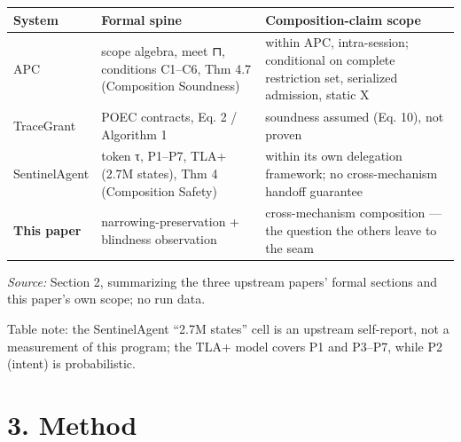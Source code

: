 \documentclass[
  10pt,
]{article}
\newcounter{none} %
\renewcommand{\_}{\allowbreak\origunderscore}
\begin{document}
{\def\LTcaptype{none} %
\begin{longtable}[]{@{}
  >{\raggedright\arraybackslash}p{}
  >{\raggedright\arraybackslash}p{}
  >{\raggedright\arraybackslash}p{}@{}}
\toprule\noalign{}
\begin{minipage}[b]{\linewidth}\raggedright
System
\end{minipage} & \begin{minipage}[b]{\linewidth}\raggedright
Formal spine
\end{minipage} & \begin{minipage}[b]{\linewidth}\raggedright
Composition-claim scope
\end{minipage} \\
\midrule\noalign{}
\endhead
\bottomrule\noalign{}
\endlastfoot
APC & scope algebra, meet ⊓, conditions C1--C6, Thm 4.7 (Composition
Soundness) & within APC, intra-session; conditional on complete
restriction set, serialized admission, static X \\
TraceGrant & POEC contracts, Eq. 2 / Algorithm 1 & soundness assumed
(Eq. 10), not proven \\
SentinelAgent & token τ, P1--P7, TLA+ (2.7M states), Thm 4 (Composition
Safety) & within its own delegation framework; no cross-mechanism
handoff guarantee \\
\textbf{This paper} & narrowing-preservation + blindness observation &
cross-mechanism composition --- the question the others leave to the
seam \\
\end{longtable}
}

\emph{Source:} Section 2, summarizing the three upstream papers' formal
sections and this paper's own scope; no run data.

Table note: the SentinelAgent ``2.7M states'' cell is an upstream
self-report, not a measurement of this program; the TLA+ model covers P1
and P3--P7, while P2 (intent) is probabilistic.

\section{3. Method}\label{method}
\end{document}
